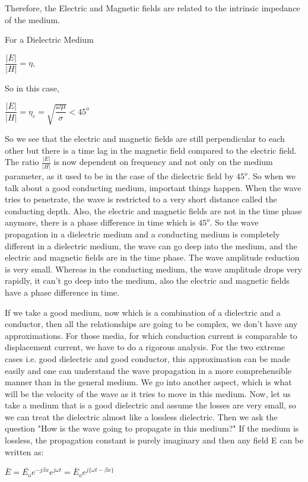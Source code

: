 Therefore, the Electric and Magnetic fields are related to the intrinsic impedance of the medium.\newline

For a Dielectric Medium
\begin{center}
$\dfrac{|E|}{|H|}=\eta,$\newline
\end{center}

So in this case, \newline

$\dfrac{|E|}{|H|}=\eta_{c}=\sqrt{\dfrac{\omega\mu}{\sigma}}<45^{o}$

So we see that the electric and magnetic fields are still perpendicular to each other but there is a time lag in the magnetic field compared to the electric field. The ratio $\frac{|E|}{|H|}$ is now dependent on frequency and not only on the medium parameter, as it used to be in the case of the dielectric field by $ 45^{o} $. So when we talk about a good conducting medium, important things happen.\newline
When the wave tries to penetrate, the wave is restricted to a very short distance called the conducting depth. Also, the electric and magnetic fields are not in the time phase anymore, there is a phase difference in time which is $ 45^{o} $.\newline
So the wave propagation in a dielectric medium and a conducting medium is completely different in a dielectric medium, the wave can go deep into the medium, and the electric and magnetic fields are in the time phase. The wave amplitude reduction is very small. Whereas in the conducting medium, the wave amplitude drops very rapidly, it can't go deep into the medium, also the electric and magnetic fields have a phase difference in time.

If we take a good medium, now which is a combination of a dielectric and a conductor, then all the relationships are going to be complex, we don't have any approximations. For those media, for which conduction current is comparable to displacement current, we have to do a rigorous analysis. For the two extreme cases i.e. good dielectric and good conductor, this approximation can be made easily and one can understand the wave propagation in a more comprehensible manner than in the general medium.
We go into another aspect, which is what will be the velocity of the wave as it tries to move in this medium. Now, let us take a medium that is a good dielectric and assume the losses are very small, so we can treat the dielectric almost like a lossless dielectric. Then we ask the question "How is the wave going to propagate in this medium?" If the medium is lossless, the propagation constant is purely imaginary and then any field E can be written as:
\begin{center}
$\bar{E}=\bar{E_{o}}e^{-j\beta x}e^{j\omega t}=\bar{E}_{o}e^{j\{\omega t-\beta x\}} $
\end{center}

